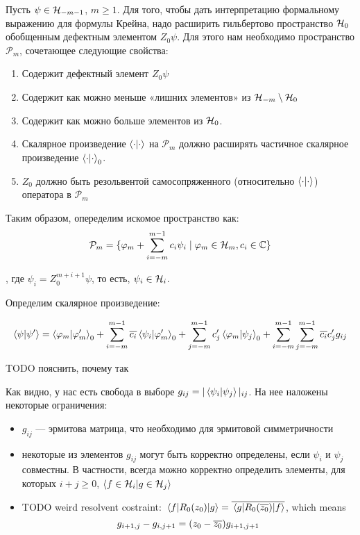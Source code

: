Пусть $\psi \in \mathcal{H}_{-m - 1}$, $m \ge 1$. Для того, чтобы дать интерпретацию формальному выражению для формулы Крейна, надо расширить гильбертово пространство $\mathcal{H}_{0}$ обобщенным дефектным элементом $Z_0 \psi$. Для этого нам необходимо пространство $\mathcal{P}_m$, сочетающее следующие свойства:

\begin{enumerate}
\item Содержит дефектный элемент $Z_0 \psi$
\item Содержит как можно меньше «лишних элементов» из  $\mathcal{H}_{-m} \setminus \mathcal{H}_{0}$
\item Содержит как можно больше элементов из $\mathcal{H}_{0}$.
\item Скалярное произведение $\ip{\cdot}{\cdot}$ на $\mathcal{P}_m$ должно расширять частичное скалярное произведение $\ip{\cdot}{\cdot}_0$.
\item $Z_0$ должно быть резольвентой самосопряженного (относительно $\ip{\cdot}{\cdot}$) оператора в $\mathcal{P}_m$
\end{enumerate}

Таким образом, опеределим искомое пространство как:
\[
\mathcal{P}_m = 
\{ \varphi_m + \sum\limits_{i = -m}^{m - 1} c_i \psi_i \mid \varphi_m \in \mathcal{H}_{m}, c_i \in \mathbb{C}\}
\]

, где $\psi_i = Z_0^{m + i + 1} \psi$, то есть, $\psi_i \in \mathcal{H}_{i}$.

Определим скалярное произведение:

\[
\ip{\psi}{\psi'} =
\ip{\varphi_m}{\varphi'_m}_0 +
\sum\limits_{i = -m}^{m - 1} \cconj{c_i} \ip{\psi_i}{\varphi'_m}_0 +
\sum\limits_{j = -m}^{m - 1} c'_j \ip{\varphi_m}{\psi_j}_0 +
\sum\limits_{i = -m}^{m - 1} \sum\limits_{j = -m}^{m - 1} \cconj{c_i} c_j' g_{ij}
\]

TODO пояснить, почему так

Как видно, у нас есть свобода в выборе $g_{ij} = | \ip{\psi_i}{\psi_j} |_{ij}$. На нее наложены некоторые ограничения:

\begin{itemize}
\item $g_{ij}$ — эрмитова матрица, что необходимо для эрмитовой симметричности
\item некоторые из элементов $g_{ij}$ могут быть корректно определены, если $\psi_i$ и $\psi_j$ совместны. В частности, всегда можно корректно определить элементы, для которых $i + j \ge 0$, $\ip{f \in \hilb{i}}{g \in \hilb{j}}$
\item TODO weird resolvent costraint: $\mel{f}{R_0(z_0)}{g} = \overline{\mel{g}{R_0(\overline{z_0})}{f}}$, which means
\[
g_{i + 1, j} - g_{i, j + 1} = (z_0 - \overline{z_0}) g_{i + 1, j + 1}
\]
\end{itemize}

